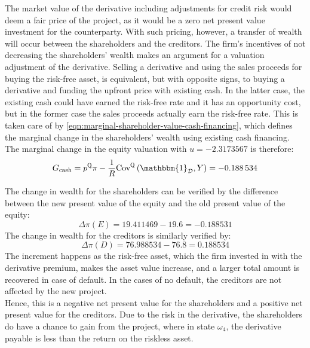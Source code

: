 \documentclass[../main.tex]{subfiles}
\begin{document}
            The market value of the derivative including adjustments for credit risk would deem a fair price of the project,
            as it would be a zero net present value investment for the counterparty.
            With such pricing, however, a transfer of wealth will occur between the shareholders and the creditors.
            The firm's incentives of not decreasing the shareholders' wealth
            makes an argument for a valuation adjustment of the derivative.
            Selling a derivative and using the sales proceeds for buying the risk-free asset,
            is equivalent, but with opposite signs,
            to buying a derivative and funding the upfront price with existing cash.
            In the latter case, the existing cash could have earned the risk-free rate
            and it has an opportunity cost,
            but in the former case the sales proceeds actually earn the risk-free rate.
            This is taken care of by \cref{eqn:marginal-shareholder-value-cash-financing},
            which defines the marginal change in the shareholders' wealth using existing cash financing.
            \\
            The marginal change in the equity valuation with $u=\num{-2.3173567}$ is therefore:
            \begin{equation}
                G_{\text{cash}} = p^{\rnmeasure}\pi
                -\discountfactor \text{Cov}^{\rnmeasure}\left(\mathbbm{1}_{\mathcal{D}},Y\right) = \num{-0.188534}
            \end{equation}

            The change in wealth for the shareholders can be verified by the difference between the new present value of the equity and the old present value of the equity:
            \begin{equation}
                \Delta \pi(E) = \num{19.411469} - \num{19.6} = \num{-0.188531}
            \end{equation}
            The change in wealth for the creditors is similarly verified by:
            \begin{equation}
                \Delta \pi(D) = \num{76.988534} - \num{76.8} = \num{0.188534}
            \end{equation}
            The increment happens as the risk-free asset, which the firm invested in with the derivative premium, 
            makes the asset value increase, and a larger total amount is recovered in case of default. 
            In the cases of no default, the creditors are not affected by the new project.
            \\
            Hence, this is a negative net present value for the shareholders 
            and a positive net present value for the creditors. 
            Due to the risk in the derivative, the shareholders do have a chance to gain from the project, 
            where in state $\omega_4$, the derivative payable is less than the return on the riskless asset.
\end{document}
